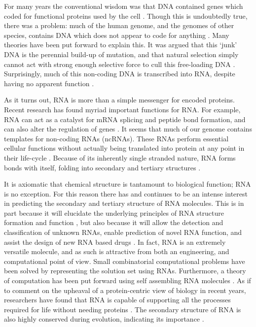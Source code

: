 \documentclass{cshonours}
\begin{document}
For many years the conventional wisdom was that DNA contained genes which coded for functional proteins used by the cell \cite{albertsessential}. Though this is undoubtedly true, there was a problem: much of the human genome, and the genomes of other species, contains DNA which does not appear to code for anything \cite{beaton1999eukaryotic}. Many theories have been put forward to explain this. It was argued that this `junk' DNA is the perennial build-up of mutation, and that natural selection simply cannot act with strong enough selective force to cull this free-loading DNA \cite{beaton1999eukaryotic}. Surprisingly, much of this non-coding DNA is transcribed into RNA, despite having no apparent function \cite{leung2013coral}. 

As it turns out, RNA is more than a simple messenger for encoded proteins. Recent research has found myriad important functions for RNA. For example, RNA can act as a catalyst for mRNA splicing and peptide bond formation, and can also alter the regulation of genes \cite{xu2012statistical}. It seems that much of our genome contains templates for non-coding RNAs (ncRNAs). These RNAs perform essential cellular functions without actually being translated into protein at any point in their life-cycle \cite{leung2013coral}. Because of its inherently single stranded nature, RNA forms bonds with itself, folding into secondary and tertiary structures \cite{conn1998rna}.


It is axiomatic that chemical structure is tantamount to biological function; RNA is no exception. For this reason there has and continues to be an intense interest in predicting the secondary and tertiary structure of RNA molecules. This is in part because it will elucidate the underlying principles of RNA structure formation and function \cite{conn1998rna}, but also because it will allow the detection and classification of unknown RNAs, enable prediction of novel RNA function, and assist the design of new RNA based drugs \cite{condon2003problems}. In fact, RNA is an extremely versatile molecule, and as such is attractive from both an engineering, and computational point of view. Small combinatorial computational problems have been solved by representing the solution set using RNAs. Furthermore, a theory of computation has been put forward using self assembling RNA molecules \cite{condon2003problems}. As if to comment on the upheaval of a protein-centric view of biology in recent years, researchers have found that RNA is capable of supporting all the processes required for life without needing proteins \cite{condon2003problems}. The secondary structure of RNA is also highly conserved during evolution, indicating its importance \cite{hofacker2008rna}. 
\end{document}
